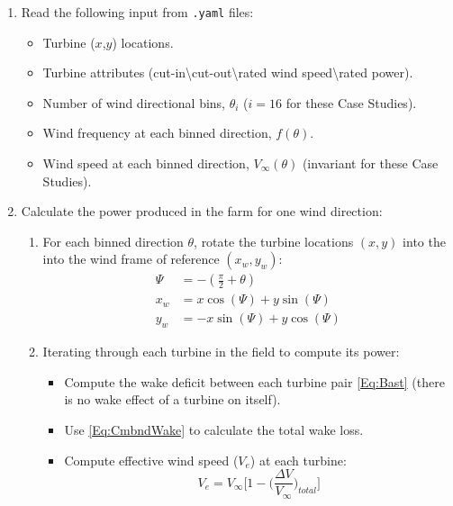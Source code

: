 \documentclass[10pt]{article}
\begin{document}
    \begin{enumerate}
        \item Read the following input from \texttt{.yaml} files:
            \begin{itemize}
                \item Turbine ($x$,$y$) locations.
                \item Turbine attributes (cut-in\textbackslash cut-out\textbackslash rated wind speed\textbackslash rated power).
                \item Number of wind directional bins, $\theta_{i}$ ($i=16$ for these Case Studies).
                \item Wind frequency at each binned direction, $f(\theta)$.
                \item Wind speed at each binned direction, $V_{\infty}(\theta)$ (invariant for these Case Studies).
            \end{itemize}
        \item Calculate the power produced in the farm for one wind direction:
            \begin{enumerate}
                \item For each binned direction $\theta$, rotate the turbine locations $(x,y)$ into the into the wind frame of reference $(x_w, y_w)$:
                \begin{align*}
                    \Psi &= -\left(\frac{\pi}{2} + \theta\right) \\
                    x_w &= x\cos(\Psi) + y\sin(\Psi)\\
                    y_w &= -x\sin(\Psi) + y\cos(\Psi)
                \end{align*}
                \item Iterating through each turbine in the field to compute its power:
                    \begin{itemize}
                        \item Compute the wake deficit between each turbine pair \cref{Eq:Bast} (there is no wake effect of a turbine on itself).
                        \item Use \cref{Eq:CmbndWake} to calculate the total wake loss.
                        \item Compute effective wind speed ($V_{e}$) at each turbine:
                            \begin{equation*}
                                V_{e} = V_{\infty} \bigg[1 - \bigg(\frac{\Delta V}{V_{\infty}}\bigg)_{total}\bigg]
                            \end{equation*}

\end{itemize}
\end{enumerate}
\end{enumerate}
\end{document}
